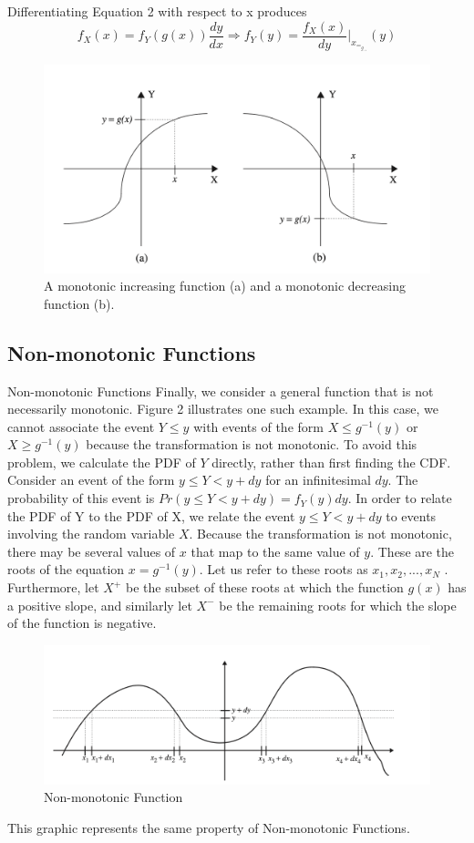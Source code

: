 \documentclass[12pt]{article}
\begin{document}
 Differentiating Equation 2 with respect to x produces
 \begin{equation}
  f_X(x)=f_Y(g(x))\frac{dy}{dx}\Rightarrow f_Y(y)=\frac{f_X(x)}{dy} |_x_=_g_^{-1}(y)
\end{equation}
\begin{figure}
    \centering
    \includegraphics[scale=0.60]{Graphy.png}
    \caption{A monotonic increasing function (a) and a monotonic decreasing function (b).}
    \label{fig:my_label}
\end{figure}
\subsection{Non-monotonic Functions}
Non-monotonic Functions Finally, we consider a general function that is not necessarily monotonic. Figure 2 illustrates one such example. In this case, we cannot associate the event {$Y \leq y$} with events of the form {$X \leq g^{−1}(y)$} or {$X \geq g^{−1}(y)$} because the transformation is not monotonic. To avoid this problem, we calculate the PDF of $Y$ directly, rather than first finding the CDF. Consider an event of the form $y \leq Y < y + dy$ for an infinitesimal $dy$. The probability of this event is {$Pr(y \leq Y < y + dy) = f_Y(y)dy$}. In order to relate the PDF of Y to the PDF of X, we relate the event ${y \leq Y < y + dy}$ to events involving the random variable $X$. Because the transformation is not monotonic, there may be several values of $x$ that map to the same value of $y$. These are the roots of the equation $x = g^{-1}(y)$. Let us refer to these roots as $x_1, x_2, . . . , x_N$ . Furthermore, let $X^{+}$ be the subset of these roots at which the function $g(x)$ has a positive slope, and similarly let  $X^{-}$ be the remaining roots for which the slope of the function is negative.
\begin{figure}[t]
    \centering
    \includegraphics[scale=0.80]{Nonmontonic.png}
    \caption{Non-monotonic Function}
    \label{fig:my_label}
\end{figure}
This graphic represents the same property of Non-monotonic Functions.
\end{document}
